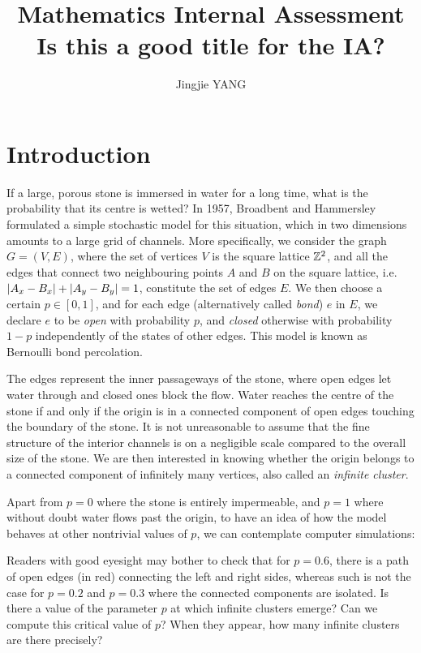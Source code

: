 \documentclass[a4paper, 12pt]{article}
\title{
\textbf{Mathematics Internal Assessment}\\
\bigskip
Is this a good title for the IA?
}
\author{Jingjie YANG}
\date{}
\begin{document}
\maketitle

\section{Introduction}
If a large, porous stone is immersed in water for a long time, what is the probability that its centre is wetted? In 1957, Broadbent and Hammersley \autocite*[693]{broadbent_hammersley_1957} formulated a simple stochastic model for this situation, which in two dimensions amounts to a large grid of channels. More specifically, we consider the graph $G = (V, E)$, where the set of vertices $V$ is the square lattice $\mathbb{Z}^2$, and all the edges that connect two neighbouring points $A$ and $B$ on the square lattice, i.e. $\lvert A_x - B_x \rvert + \lvert A_y - B_y \rvert = 1$, constitute the set of edges $E$. We then choose a certain $p \in [0, 1]$, and for each edge (alternatively called \textit{bond}) $e$ in $E$, we declare $e$ to be \textit{open} with probability $p$, and \textit{closed} otherwise with probability $1 - p$ independently of the states of other edges. This model is known as Bernoulli bond percolation.



The edges represent the inner passageways of the stone, where open edges let water through and closed ones block the flow. Water reaches the centre of the stone if and only if the origin is in a connected component of open edges touching the boundary of the stone. It is not unreasonable to assume that the fine structure of the interior channels is on a negligible scale compared to the overall size of the stone. We are then interested in knowing whether the origin belongs to a connected component of infinitely many vertices, also called an \textit{infinite cluster}. 

Apart from $p = 0$ where the stone is entirely impermeable, and $p = 1$ where without doubt water flows past the origin, to have an idea of how the model behaves at other nontrivial values of $p$, we can contemplate computer simulations:


\break 

Readers with good eyesight may bother to check that for $p = 0.6$, there is a path of open edges (in red) connecting the left and right sides, whereas such is not the case for $p = 0.2$ and $p = 0.3$ where the connected components are isolated. Is there a value of the parameter $p$ at which infinite clusters emerge? Can we compute this critical value of $p$? When they appear, how many infinite clusters are there precisely?
\end{document}
